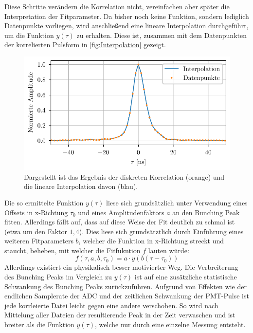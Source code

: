 Diese Schritte verändern die Korrelation nicht, vereinfachen aber später die Interpretation der Fitparameter. 
Da bisher noch keine Funktion, sondern lediglich Datenpunkte vorliegen, wird anschließend eine lineare Interpolation durchgeführt, um die Funktion $y(\tau)$ zu erhalten. 
Diese ist, zusammen mit dem Datenpunkten der korrelierten Pulsform in \autoref{fig:Interpolation} gezeigt. 
\begin{figure}[h]
    \centering
    \includegraphics{images/Analysis/interpolation.pdf}
    \caption{Dargestellt ist das Ergebnis der diskreten Korrelation (orange) und die lineare Interpolation davon (blau).}
    \label{fig:Interpolation}
\end{figure}
Die so ermittelte Funktion $y(\tau)$ liese sich grundsätzlich unter Verwendung eines Offsets in x-Richtung $\tau_0$ und eines Amplitudenfaktors $a$ an den Bunching Peak fitten. 
Allerdings fällt auf, dass auf diese Weise der Fit deutlich zu schmal ist (etwa um den Faktor $1{,}4$). 
Dies liese sich grundsätztlich durch Einführung eines weiteren Fitparameters $b$, welcher die Funktion in x-Richtung streckt und staucht, beheben, mit welcher die Fitfukntion $f$ lauten würde: 
\begin{equation}
    f(\tau, a, b, \tau_0) = a\cdot y(b(\tau - \tau_0))
\end{equation}
Allerdings existiert ein physikalisch besser motivierter Weg. 
Die Verbreiterung des Bunching Peaks im Vergleich zu $y(\tau)$ ist auf eine zusätzliche statistische Schwankung des Bunching Peaks zurückzuführen. 
Aufgrund von Effekten wie der endlichen Samplerate der ADC und der zeitlichen Schwankung der PMT-Pulse ist jede korrleierte Datei leicht gegen eine andere verschoben. 
So wird nach Mittelung aller Dateien der resultierende Peak in der Zeit verwaschen und ist breiter als die Funktion $y(\tau)$, welche nur durch eine einzelne Messung entsteht. 
